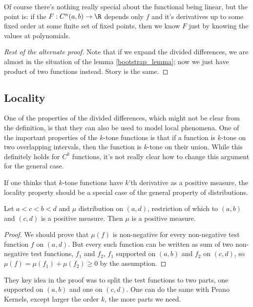 Of course there's nothing really special about the functional being linear, but the point is: if the $F : C^{n}(a, b) \to \R$ depends only $f$ and it's derivatives up to some fixed order at some finite set of fixed points, then we know $F$ just by knowing the values at polynomials.

\begin{proof}[Rest of the alternate proof]
	Note that if we expand the divided differences, we are almost in the situation of the lemma \ref{bootstrap_lemma}; now we just have product of two functions instead. Story is the same.
\end{proof}

\subsection{Locality}

One of the properties of the divided differences, which might not be clear from the definition, is that they can also be used to model local phenomena. One of the important properties of the $k$-tone functions is that if a function is $k$-tone on two overlapping intervals, then the function is $k$-tone on their union. While this definitely holds for $C^{k}$ functions, it's not really clear how to change this argument for the general case.

If one thinks that $k$-tone functions have $k$'th derivative as a positive measure, the locality property should be a special case of the general property of distributions.
\begin{prop}
	Let $a < c < b < d$ and $\mu$ distribution on $(a, d)$, restriction of which to $(a, b)$ and $(c, d)$ is a positive measure. Then $\mu$ is a positive measure.
\end{prop}
\begin{proof}
	We should prove that $\mu(f)$ is non-negative for every non-negative test function $f$ on $(a, d)$. But every such function can be written as sum of two non-negative test functions, $f_{1}$ and $f_{2}$, $f_{1}$ supported on $(a, b)$ and $f_{2}$ on $(c, d)$, so $\mu(f) = \mu(f_{1}) + \mu(f_{2}) \geq 0$ by the assumption.
\end{proof}

They key idea in the proof was to split the test functions to two parts, one supported on $(a, b)$ and one on $(c, d)$. One can do the same with Peano Kernels, except larger the order $k$, the more parts we need. 

